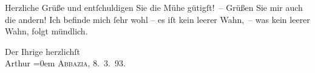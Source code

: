 \pstart
           Herzliche Grüße und entſchuldigen Sie die Mühe gütigſt! – Grüßen Sie mir auch die
                    andern! Ich befinde mich{ }ſehr wohl – {\pb}es iſt kein
                    leerer Wahn, – was kein leerer Wahn, folgt mündlich.\pend
           
\pstart
           Der Ihrige herzlichſt {\\[\baselineskip]}\spacefill\mbox{Arthur}\pend
           \leftskip=0em{}
\pstart
           \textsc{Abbazia}, 8. 3. 93.\pend
           \endnumbering{}  \newcommand{\dateiname}{L00188}\newcommand{\titel}{Arthur Schnitzler an Richard Beer-Hofmann, 8. 3. 1893}\newcommand{\editorInnen}{Martin Anton Müller und Gerd-Hermann Susen}
